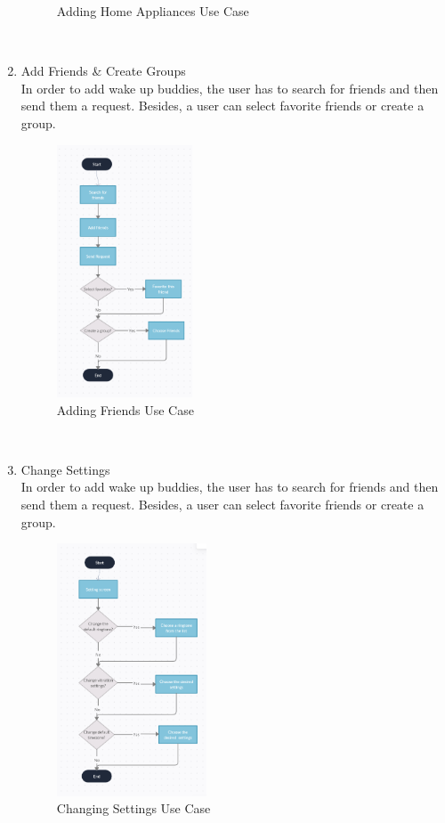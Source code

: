 \documentclass[conference]{IEEEtran}
\begin{document}
\begin{enumerate}
\begin{figure}[htbp]
            \caption{Adding Home Appliances Use Case}
            \label{fig}
        \end{figure}\\
    \item Add Friends \& Create Groups \\
       In order to add wake up buddies, the user has to search for friends and then send them a request. Besides, a user can select favorite friends or create a group.
        \begin{figure}[htbp]
            \centerline{\includegraphics[height=75mm,scale=0.5]{Images/UseCase_AddFriend.png}}
            \caption{Adding Friends Use Case}
            \label{fig}
        \end{figure}\\
    \vspace{10pt}
    \item Change Settings \\
       In order to add wake up buddies, the user has to search for friends and then send them a request. Besides, a user can select favorite friends or create a group.
        \begin{figure}[htbp]
            \centerline{\includegraphics[height=75mm,scale=0.5]{Images/UseCase_Settings.png}}
            \caption{Changing Settings Use Case}
            \label{fig}
        \end{figure}\\
    
\end{enumerate}
\end{document}
